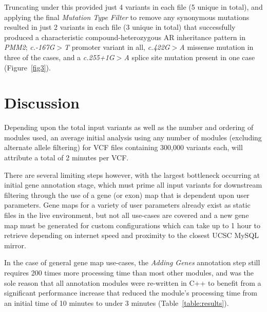 \documentclass[twocolumn]{bmcart}%
\begin{document}
Truncating under this provided just 4 variants in each file (5 unique in total), and applying the final \textit{Mutation Type Filter} to remove any synonymous mutations resulted in just 2 variants in each file (3 unique in total) that successfully produced a characteristic compound-heterozygous AR inheritance pattern in \textit{PMM2}; \textit{c.-167G}$>$\textit{T} promoter variant in all, \textit{c.422G}$>$\textit{A} missense mutation in three of the cases, and a \textit{c.255+1G}$>$\textit{A} splice site mutation present in one case (Figure~\ref{fig3}).




\section*{Discussion}

Depending upon the total input variants as well as the number and ordering of modules used, an average initial analysis using any number of modules (excluding alternate allele filtering) for VCF files containing 300,000 variants each, will attribute a total of 2 minutes per VCF.

There are several limiting steps however, with the largest bottleneck occurring at initial gene annotation stage, which must prime all input variants for downstream filtering through the use of a gene (or exon) map that is dependent upon user parameters. Gene maps for a variety of user parameters already exist as static files in the live environment, but not all use-cases are covered and a new gene map must be generated for custom configurations which can take up to 1 hour to retrieve depending on internet speed and proximity to the closest UCSC MySQL mirror.

In the case of general gene map use-cases, the \textit{Adding Genes} annotation step still requires 200 times more processing time than most other modules, and was the sole reason that all annotation modules were re-written in C++ to benefit from a significant performance increase that reduced the module's processing time from an initial time of 10 minutes to under 3 minutes (Table~\ref{table:results}). 
\end{document}
